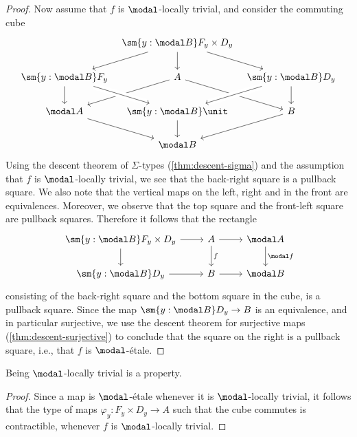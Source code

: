 \documentclass{msc}
\begin{document}
\begin{proof}
  Now assume that $f$ is $\modal$-locally trivial, and consider the commuting cube
  \begin{equation*}
    \begin{tikzcd}[column sep=tiny]
      & \sm{y:\modal B}F_y\times D_y \arrow[dl] \arrow[d] \arrow[dr] & \phantom{\modal A} \\
      \sm{y:\modal B}F_y \arrow[d] & A \arrow[dl] \arrow[dr] & \sm{y:\modal B}D_y \arrow[dl,crossing over] \arrow[d] \\
      \modal A \arrow[dr] & \sm{y:\modal B}\unit \arrow[from=ul,crossing over] \arrow[d] & B \arrow[dl] \\
      & \modal B
    \end{tikzcd}
  \end{equation*}
  Using the descent theorem of $\Sigma$-types (\cref{thm:descent-sigma}) and the assumption that $f$ is $\modal$-locally trivial, we see that the back-right square is a pullback square. We also note that the vertical maps on the left, right and in the front are equivalences. Moreover, we observe that the top square and the front-left square are pullback squares. Therefore it follows that the rectangle 
  \begin{equation*}
    \begin{tikzcd}
      \sm{y:\modal B} F_y\times D_y \arrow[r] \arrow[d] & A \arrow[d,"f"] \arrow[r] & \modal A \arrow[d,"\modal f"] \\
      \sm{y:\modal B}D_y \arrow[r] & B \arrow[r] & \modal B 
    \end{tikzcd}
  \end{equation*}
  consisting of the back-right square and the bottom square in the cube, is a pullback square. Since the map $\sm{y:\modal B}D_y\to B$ is an equivalence, and in particular surjective, we use the descent theorem for surjective maps (\cref{thm:descent-surjective}) to conclude that the square on the right is a pullback square, i.e., that $f$ is $\modal$-\'etale.
\end{proof}

\begin{cor}
  Being $\modal$-locally trivial is a property.
\end{cor}

\begin{proof}
  Since a map is $\modal$-\'etale whenever it is $\modal$-locally trivial, it follows that the type of maps $\varphi_y:F_y\times D_y\to A$ such that the cube commutes is contractible, whenever $f$ is $\modal$-locally trivial.
\end{proof}
\end{document}
